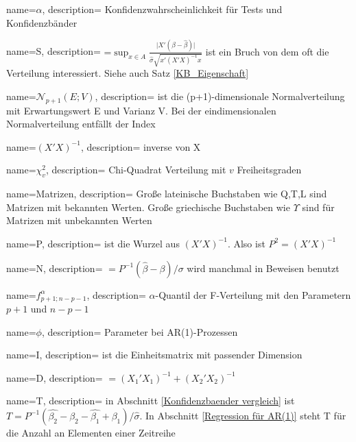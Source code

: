 
{
    name=$\alpha$,
    description={ Konfidenzwahrscheinlichkeit für Tests und Konfidenzbänder}
}  
 
{
    name=S,
    description={ =$\sup_{x\in A} \frac{\vert X'(\beta-\hat{\beta}) \vert}{\hat{\sigma} \sqrt{x'(X'X)^{-1}x}}$ ist ein Bruch von dem oft die Verteilung interessiert. Siehe auch Satz \ref{KB_Eigenschaft}}
}  

{
    name=$\mathscr{N}_{p+1}(E;V)$,
    description={ ist die (p+1)-dimensionale Normalverteilung mit Erwartungswert E und Varianz V. Bei der eindimensionalen Normalverteilung entfällt der Index}
} 

{
    name=$(X'X)^{-1}$,
    description={ inverse von X}
} 
 
{
    name=$\chi_v^2$,
    description={ Chi-Quadrat Verteilung mit $v$ Freiheitsgraden}
}  
 
{
    name=Matrizen,
    description={ Große lateinische Buchstaben wie Q,T,L sind Matrizen mit bekannten Werten. Große griechische Buchstaben wie $\Upsilon$ sind für Matrizen mit unbekannten Werten}
}  
 
{
    name=P,
    description={ ist die Wurzel aus $(X'X)^{-1}$. Also ist $P^2=(X'X)^{-1}$}
}  

{
    name=N,
    description={ $=P^{-1}(\hat{\beta}-\beta)/\sigma$ wird manchmal in Beweisen benutzt}
} 
 
{
    name=$f^{\alpha}_{p+1;n-p-1}$,
    description={ $\alpha$-Quantil der F-Verteilung mit den Parametern $p+1$ und $n-p-1$}
} 

{
    name=$\phi$,
    description={ Parameter bei AR(1)-Prozessen}
} 

{
    name=I,
    description={ ist die Einheitsmatrix mit passender Dimension}
} 

{
    name=D,
    description={ $=(X_1'X_1)^{-1}+(X_2'X_2)^{-1}$}
} 

{
    name=T,
    description={ in Abschnitt \ref{Konfidenzbaender vergleich} ist $T=P^{-1}(\hat{\beta_2}-\beta_2-\hat{\beta_1}+\beta_1)/\hat{\sigma}$. In Abschnitt \ref{Regression für AR(1)} steht T für die Anzahl an Elementen einer Zeitreihe}
} 

